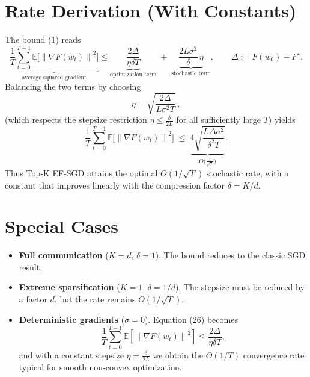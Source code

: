 \documentclass{article}
\newcommand{\E}{\mathbb{E}}
\newcommand{\norm}[1]{\left\lVert #1 \right\rVert}
\begin{document}
\section*{Rate Derivation (With Constants)}
The bound (1) reads
\[
\underbrace{\frac{1}{T}\sum_{t=0}^{T-1}\E\!\big[\norm{\nabla F(w_t)}^{2}\big]}_{\text{average squared gradient}}
\le
\underbrace{\frac{2\Delta}{\eta\delta T}}_{\text{optimization term}}
\;+\;
\underbrace{\frac{2L\sigma^{2}}{\delta}\,\eta}_{\text{stochastic term}},
\qquad\Delta:=F(w_0)-F^\star .
\]
Balancing the two terms by choosing
\[
\eta = \sqrt{\frac{2\Delta}{L\sigma^{2}T}}\,,
\]
(which respects the stepsize restriction $\eta\le\frac{\delta}{2L}$ for all sufficiently large $T$) yields
\[
\frac{1}{T}\sum_{t=0}^{T-1}\E\!\big[\norm{\nabla F(w_t)}^{2}\big]
\;\le\;
\underbrace{4\sqrt{\frac{L\Delta\sigma^{2}}{\delta^{2}T}}}_{\displaystyle O\!\big(\tfrac{1}{\sqrt{T}}\big)} .
\]
Thus Top‑K EF‑SGD attains the optimal $O(1/\sqrt{T})$ stochastic rate, with a constant that improves linearly with the compression factor $\delta=K/d$.

\section*{Special Cases}
\begin{itemize}[noitemsep]
\item \textbf{Full communication} ($K=d$, $\delta=1$).  The bound reduces to the classic SGD result.
\item \textbf{Extreme sparsification} ($K=1$, $\delta=1/d$).  The stepsize must be reduced by a factor $d$, but the rate remains $O(1/\sqrt{T})$.
\item \textbf{Deterministic gradients} ($\sigma=0$).  Equation (26) becomes
\[
\frac{1}{T}\sum_{t=0}^{T-1}\E[\norm{\nabla F(w_t)}^{2}]
\le \frac{2\Delta}{\eta\delta T},
\]
and with a constant stepsize $\eta=\frac{\delta}{2L}$ we obtain the $O(1/T)$ convergence rate typical for smooth non‑convex optimization.
\end{itemize}
\end{document}
